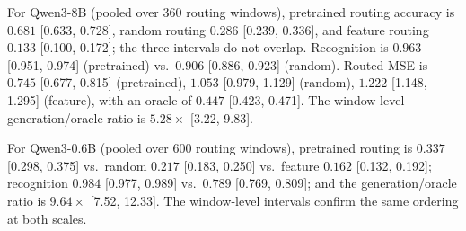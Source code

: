 \documentclass{article}
\begin{document}
For Qwen3-8B (pooled over 360 routing windows), pretrained routing accuracy is
$0.681$ [0.633, 0.728], random routing $0.286$ [0.239, 0.336], and feature
routing $0.133$ [0.100, 0.172]; the three intervals do not overlap.
Recognition is $0.963$ [0.951, 0.974] (pretrained) vs.\ $0.906$ [0.886, 0.923]
(random).  Routed MSE is $0.745$ [0.677, 0.815] (pretrained), $1.053$
[0.979, 1.129] (random), $1.222$ [1.148, 1.295] (feature), with an oracle of
$0.447$ [0.423, 0.471].  The window-level generation/oracle ratio is $5.28\times$
[3.22, 9.83].

For Qwen3-0.6B (pooled over 600 routing windows), pretrained routing is
$0.337$ [0.298, 0.375] vs.\ random $0.217$ [0.183, 0.250] vs.\ feature $0.162$
[0.132, 0.192]; recognition $0.984$ [0.977, 0.989] vs.\ $0.789$ [0.769, 0.809];
and the generation/oracle ratio is $9.64\times$ [7.52, 12.33].
The window-level intervals confirm the same ordering at both scales.
\end{document}
